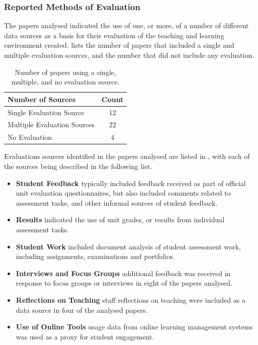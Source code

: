 
\subsubsection{Reported Methods of Evaluation} %
\label{sub:method_for_evaluating_results}

The papers analysed indicated the use of one, or more, of a number of different data sources as a basis for their evaluation of the teaching and learning environment created.  lists the number of papers that included a single and multiple evaluation sources, and the number that did not include any evaluation.

\begin{table}[h]
	\centering
	\caption{Number of papers using a single, multiple, and no evaluation source.}
	\label{tbl:eval_source}
	\footnotesize
    \begin{tabular}{l|c}
     \textbf{Number of Sources} & \textbf{Count} \\ \hline
	Single Evaluation Source	 & 12 \\
	Multiple Evaluation Sources	 & 22 \\
	No Evaluation & 	4 \\
    \end{tabular}
\end{table}

Evaluations sources identified in the papers analysed are listed in , with each of the sources being described in the following list. 

\begin{itemize}[noitemsep,nolistsep]
	\item \textbf{Student Feedback} typically included feedback received as part of official unit evaluation questionnaires, but also included comments related to assessment tasks, and other informal sources of student feedback.
	\item \textbf{Results} indicated the use of unit grades, or results from individual assessment tasks.
	\item \textbf{Student Work} included document analysis of student assessment work, including assignments, examinations and portfolios.
	\item \textbf{Interviews and Focus Groups} additional feedback was received in response to focus groups or interviews in eight of the papers analysed.
	\item \textbf{Reflections on Teaching} staff reflections on teaching were included as a data source in four of the analysed papers.
	\item \textbf{Use of Online Tools} usage data from online learning management systems was used as a proxy for student engagement.
\end{itemize}


